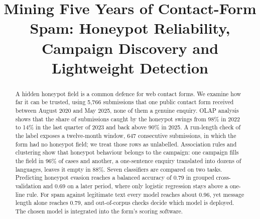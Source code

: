 \documentclass[conference]{IEEEtran}
\begin{document}
\title{Mining Five Years of Contact-Form Spam: Honeypot Reliability, Campaign Discovery and Lightweight Detection}

\author{
\and
{}
\and
{}
}

\maketitle

\begin{abstract}
A hidden honeypot field is a common defence for web contact forms. We examine how far it can be trusted, using
5,766 submissions that one public contact form received between August 2020 and May 2025, none of them a
genuine enquiry. OLAP analysis shows that the share of submissions caught by the honeypot swings from 98\% in
2022 to 14\% in the last quarter of 2023 and back above 90\% in 2025. A run-length check of the label exposes a
twelve-month window, 647 consecutive submissions, in which the form had no honeypot field; we treat those
rows as unlabelled. Association rules and clustering show that honeypot behaviour belongs to the campaign: one
campaign fills the field in 96\% of cases and another, a one-sentence enquiry translated into dozens of
languages, leaves it empty in 88\%. Seven classifiers are compared on two tasks. Predicting honeypot evasion
reaches a balanced accuracy of 0.79 in grouped cross-validation and 0.69 on a later period, where only logistic
regression stays above a one-line rule. For spam against legitimate text every model reaches about 0.96, yet
message length alone reaches 0.79, and out-of-corpus checks decide which model is deployed. The chosen model is
integrated into the form's scoring software.
\end{abstract}
\end{document}

